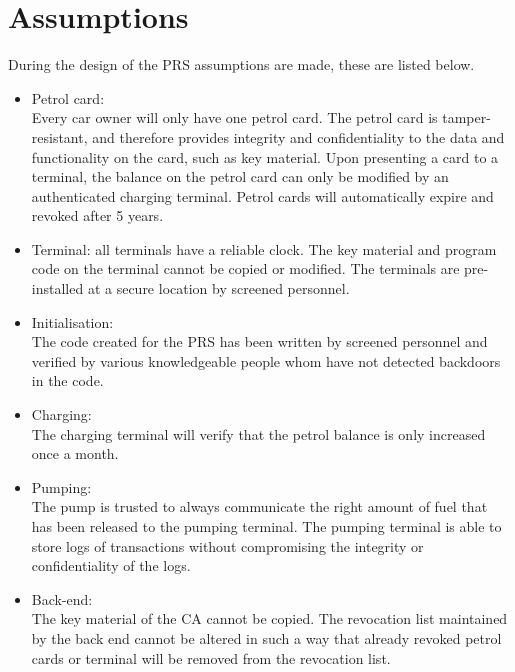 \section{Assumptions}
During the design of the PRS assumptions are made, these are listed below.
\begin{itemize}
\item Petrol card:\\
Every car owner will only have one petrol card. The petrol card is tamper-resistant, and therefore provides integrity and confidentiality to the data and functionality on the card, such as key material. Upon presenting a card to a terminal, the balance on the petrol card can only be modified by an authenticated charging terminal.  Petrol cards will automatically expire and revoked after 5 years.

\item Terminal: all terminals have a reliable clock. The key material and program code on the terminal cannot be copied or modified. The terminals are pre-installed at a secure location by screened personnel.

\item Initialisation:\\
The code created for the PRS has been written by screened personnel and verified by various knowledgeable people whom have not detected backdoors in the code. %

\item Charging:\\
The charging terminal will verify that the petrol balance is only increased once a month. 

\item Pumping:\\
The pump is trusted to always communicate the right amount of fuel that has been released to the pumping terminal. The pumping terminal is able to store logs of transactions without compromising the integrity or confidentiality of the logs.

\item Back-end:\\
The key material of the CA cannot be copied. The revocation list maintained by the back end cannot be altered in such a way that already revoked petrol cards or terminal will be removed from the revocation list. 
\end{itemize}

 
